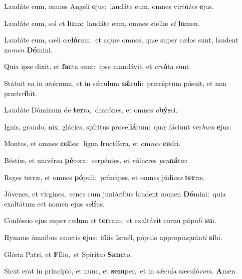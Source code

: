 Laudáte eum, omnes Angeli \textbf{e}jus:~\redgreheightstar laudáte eum, omnes virtú\textit{tes} \textbf{e}jus.

Laudáte eum, sol et \textbf{lu}na:~\redgreheightstar laudáte eum, omnes stellæ \textit{et} \textbf{lu}men.

Laudáte eum, cæli cæ\textbf{ló}rum:~\redgreheightstar et aquæ omnes, quæ super cælos sunt, laudent no\textit{men} \textbf{Dó}mini.

Quia ipse dixit, et \textbf{fac}ta sunt:~\redgreheightstar ipse mandávit, et \textit{cre}\textbf{á}ta sunt.

Státuit ea in ætérnum, et in sǽculum \textbf{sǽ}culi:~\redgreheightstar præcéptum pósuit, et non præ\textit{ter}\textbf{í}bit.

Laudáte Dóminum de \textbf{ter}ra,~\redgreheightstar dracónes, et omnes \textit{a}\textbf{býs}si.

Ignis, grando, nix, glácies, spíritus procel\textbf{lá}rum:~\redgreheightstar quæ fáciunt ver\textit{bum} \textbf{e}jus:

Montes, et omnes \textbf{col}les:~\redgreheightstar ligna fructífera, et om\textit{nes} \textbf{ce}dri.

Béstiæ, et univérsa \textbf{pé}cora:~\redgreheightstar serpéntes, et vólucres \textit{pen}\textbf{ná}tæ:

Reges terræ, et omnes \textbf{pó}puli:~\redgreheightstar príncipes, et omnes júdi\textit{ces} \textbf{ter}ræ.

Júvenes, et vírgines,~\reddagger senes cum junióribus laudent nomen \textbf{Dó}mini:~\redgreheightstar quia exaltátum est nomen ejus \textit{so}\textbf{lí}us.

Conféssio ejus super cælum et \textbf{ter}ram:~\redgreheightstar et exaltávit cornu pópu\textit{li} \textbf{su}i.

Hymnus ómnibus sanctis \textbf{e}jus:~\redgreheightstar fíliis Israël, pópulo appropinquán\textit{ti} \textbf{si}bi.

Glória Patri, et \textbf{Fí}lio,~\redgreheightstar et Spirítu\textit{i} \textbf{Sanc}to.

Sicut erat in princípio, et nunc, et \textbf{sem}per,~\redgreheightstar et in sǽcula sæculó\textit{rum}. \textbf{A}men.

